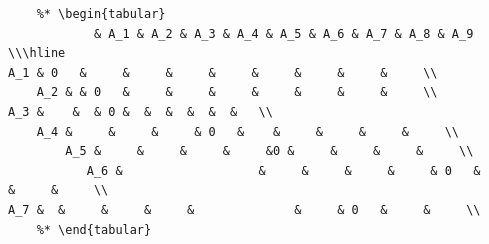 
\begin{verbatim}
	%* \begin{tabular}
		    & A_1 & A_2 & A_3 & A_4 & A_5 & A_6 & A_7 & A_8 & A_9 \\\hline
A_1 & 0   &     &     &     &     &     &     &     &     \\
	A_2 & & 0   &     &     &     &     &     &     &     \\
A_3 &    &  & 0 &  &  &  &  &  &   \\
	A_4 &     &     &     & 0   &    &     &     &     &     \\
		A_5 &     &     &     &     &0 &     &     &     &     \\
		   A_6 &                   &     &     &     &     & 0   &     &     &     \\
A_7 &  &     &     &     &              &     & 0   &     &     \\
	%* \end{tabular}
\end{verbatim}
